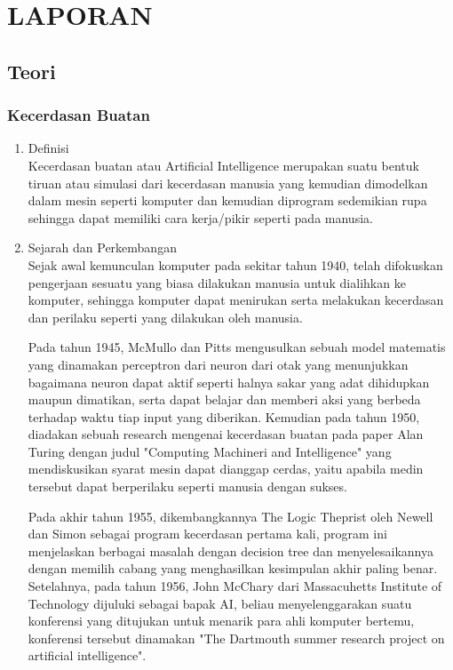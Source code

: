\chapter{LAPORAN}
\section{Teori}
\subsection{Kecerdasan Buatan}
\begin{enumerate}
    \item Definisi\\
    Kecerdasan buatan atau Artificial Intelligence merupakan suatu bentuk tiruan atau simulasi dari kecerdasan manusia yang kemudian dimodelkan dalam mesin seperti komputer dan kemudian diprogram sedemikian rupa sehingga dapat memiliki cara kerja/pikir seperti pada manusia.
    \item Sejarah dan Perkembangan\\
    Sejak awal kemunculan komputer pada sekitar tahun 1940, telah difokuskan pengerjaan sesuatu yang biasa dilakukan manusia untuk dialihkan ke komputer, sehingga komputer dapat menirukan serta melakukan kecerdasan dan perilaku seperti yang dilakukan oleh manusia.\\
    \par
    Pada tahun 1945, McMullo dan Pitts mengusulkan sebuah model matematis yang dinamakan perceptron dari neuron dari otak yang menunjukkan bagaimana neuron dapat aktif seperti halnya sakar yang adat dihidupkan maupun dimatikan, serta dapat belajar dan memberi aksi yang berbeda terhadap waktu tiap input yang diberikan.
    Kemudian pada tahun 1950, diadakan sebuah research mengenai kecerdasan buatan pada paper Alan Turing dengan judul "Computing Machineri and Intelligence" yang mendiskusikan syarat mesin dapat dianggap cerdas, yaitu apabila medin tersebut dapat berperilaku seperti manusia dengan sukses.
    \par 
    Pada akhir tahun 1955, dikembangkannya The Logic Theprist oleh Newell dan Simon sebagai program kecerdasan pertama kali, program ini menjelaskan berbagai masalah dengan decision tree dan menyelesaikannya dengan memilih cabang yang menghasilkan kesimpulan akhir paling benar.\\
    Setelahnya, pada tahun 1956, John McChary dari Massacuhetts Institute of Technology dijuluki sebagai bapak AI, beliau menyelenggarakan suatu konferensi yang ditujukan untuk menarik para ahli komputer bertemu, konferensi tersebut dinamakan "The Dartmouth summer research project on artificial intelligence".
\end{enumerate}

